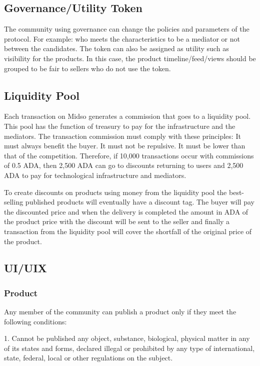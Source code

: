 \documentclass[12pt]{article}
\begin{document}
\subsection { Governance/Utility Token} 

The community using governance can change the policies and parameters of the protocol. For example: who meets the characteristics to be a mediator or not between the candidates. The token can also be assigned as utility such as visibility for the products. In this case, the product timeline/feed/views should be grouped to be fair to sellers who do not use the token.


\subsection { Liquidity Pool }

Each transaction on Midso generates a commission that goes to a liquidity pool. This pool has the function of treasury to pay for the infrastructure and the mediators.
The transaction commission must comply with these principles: It must always benefit the buyer. It must not be repulsive. It must be lower than that of the competition. Therefore, if 10,000 transactions occur with commissions of 0.5 ADA, then 2,500 ADA can go to discounts returning to users and 2,500 ADA to pay for technological infrastructure and mediators. 

To create discounts on products using money from the liquidity pool the best-selling published products will eventually have a discount tag. The buyer will pay the discounted price and when the delivery is completed the amount in ADA of the product price with the discount will be sent to the seller and finally a transaction from the liquidity pool will cover the shortfall of the original price of the product.

\subsection{ UI/UIX }

\subsubsection { Product } 

Any member of the community can publish a product only if they meet the following conditions:

1. Cannot be published any object, substance, biological, physical matter in any of its states and forms, declared illegal or prohibited by any type of international, state, federal, local or other regulations on the subject.
\end{document}

